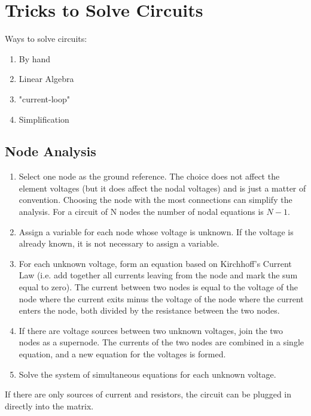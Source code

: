 \documentclass[00_complete]{subfiles}
\begin{document}
\section{Tricks to Solve Circuits}
Ways to solve circuits:
\begin{enumerate}
    \item By hand
    \item Linear Algebra
    \item "current-loop"
    \item Simplification
\end{enumerate}
\subsection{Node Analysis}
\begin{enumerate}
    \item Select one node as the ground reference. The choice does not affect
        the element voltages (but it does affect the nodal voltages) and is
        just a matter of convention. Choosing the node with the most
        connections can simplify the analysis. For a circuit of N nodes the
        number of nodal equations is $N-1$.
    \item Assign a variable for each node whose voltage is unknown. If the
        voltage is already known, it is not necessary to assign a variable.
    \item For each unknown voltage, form an equation based on Kirchhoff's
        Current Law (i.e. add together all currents leaving from the node and
        mark the sum equal to zero). The current between two nodes is equal to
        the voltage of the node where the current exits minus the voltage of
        the node where the current enters the node, both divided by the
        resistance between the two nodes.
    \item If there are voltage sources between two unknown voltages, join the
        two nodes as a supernode. The currents of the two nodes are combined in
        a single equation, and a new equation for the voltages is formed.
    \item Solve the system of simultaneous equations for each unknown voltage.
\end{enumerate}
If there are only sources of current and resistors, the circuit can be plugged
in directly into the matrix.
\end{document}
